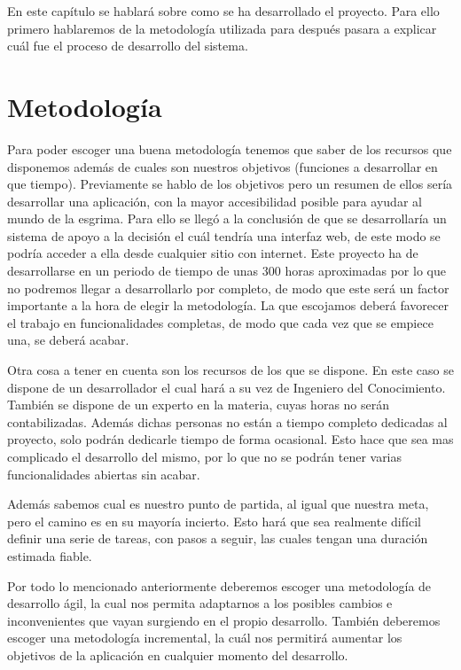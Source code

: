En este capítulo se hablará sobre como se ha desarrollado el proyecto. Para ello primero hablaremos
de la metodología utilizada para después pasara a explicar cuál fue el proceso de desarrollo del sistema.

\section{Metodología}

Para poder escoger una buena metodología tenemos que saber de los recursos que disponemos además
de cuales son nuestros objetivos (funciones a desarrollar en que tiempo). Previamente se hablo
de los objetivos pero un resumen de ellos sería desarrollar una aplicación, con la mayor
accesibilidad posible para ayudar al mundo de la esgrima. Para ello se llegó a la conclusión de que
se desarrollaría un sistema de apoyo a la decisión el cuál tendría una interfaz web, de este modo
se podría acceder a ella desde cualquier sitio con internet. Este proyecto ha de desarrollarse
en un periodo de tiempo de unas 300 horas aproximadas por lo que no podremos llegar a
desarrollarlo por completo, de modo que este será un factor importante a la hora de elegir la metodología.
La que escojamos deberá favorecer el trabajo en funcionalidades completas, de modo que cada vez
que se empiece una, se deberá acabar.

Otra cosa a tener en cuenta son los recursos de los que se dispone. En este caso se dispone de
un desarrollador el cual hará a su vez de Ingeniero del Conocimiento. También se dispone de un
experto en la materia, cuyas horas no serán contabilizadas. Además dichas personas no están a tiempo
completo dedicadas al proyecto, solo podrán dedicarle tiempo de forma ocasional. Esto hace que sea
mas complicado el desarrollo del mismo, por lo que no se podrán tener varias funcionalidades abiertas
sin acabar.

Además sabemos cual es nuestro punto de partida, al igual que nuestra meta, pero el camino es
en su mayoría incierto. Esto hará que sea realmente difícil definir una serie de tareas, con
pasos a seguir, las cuales tengan una duración estimada fiable.

Por todo lo mencionado anteriormente deberemos escoger una metodología de desarrollo ágil, la cual
nos permita adaptarnos a los posibles cambios e inconvenientes que vayan surgiendo en el propio
desarrollo. También deberemos escoger una metodología incremental, la cuál nos permitirá aumentar
los objetivos de la aplicación en cualquier momento del desarrollo.


